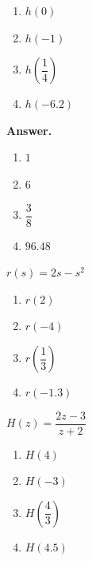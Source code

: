 \documentclass[10pt,]{book}
\theoremstyle{plain}
\theoremstyle{definition}
\theoremstyle{definition}
\theoremstyle{definition}
\theoremstyle{definition}
\numberwithin{equation}{part}
\begin{document}
\begin{exerciselist}
\begin{exercisegroup}
\begin{multicols}{2}
\begin{enumerate}[label=\alph*]
\item\hypertarget{li-417}{}\(h(0)\)%
\item\hypertarget{li-418}{}\(h(-1)\)%
\item\hypertarget{li-419}{}\(h\left(\dfrac{1}{4}\right)\)%
\item\hypertarget{li-420}{}\(h(-6.2)\)%
\end{enumerate}
\end{multicols}
%
\par\smallskip
\noindent\textbf{Answer.}\hypertarget{answer-65}{}\quad
\leavevmode%
\begin{multicols}{2}
\begin{enumerate}[label=\alph*]
\item\hypertarget{li-421}{}\(1\)%
\item\hypertarget{li-422}{}\(6\)%
\item\hypertarget{li-423}{}\(\dfrac{3}{8}\)%
\item\hypertarget{li-424}{}\(96.48 \)%
\end{enumerate}
\end{multicols}
%
\exercise[44.]\hypertarget{exercise-113}{}\(r (s) = 2s - s^2\) \leavevmode%
\begin{multicols}{2}
\begin{enumerate}[label=\alph*]
\item\hypertarget{li-425}{}\(r(2)\)%
\item\hypertarget{li-426}{}\(r(-4)\)%
\item\hypertarget{li-427}{}\(r\left(\dfrac{1}{3}\right)\)%
\item\hypertarget{li-428}{}\(r(-1.3)\)%
\end{enumerate}
\end{multicols}
%
\exercise[45.]\hypertarget{exercise-114}{}\(H(z) = \dfrac{2z - 3}{z + 2}\) \leavevmode%
\begin{multicols}{2}
\begin{enumerate}[label=\alph*]
\item\hypertarget{li-429}{}\(H(4)\)%
\item\hypertarget{li-430}{}\(H(-3)\)%
\item\hypertarget{li-431}{}\(H\left(\dfrac{4}{3}\right)\)%
\item\hypertarget{li-432}{}\(H(4.5)\)%
\end{enumerate}
\end{multicols}
%
\par\smallskip

\end{exercisegroup}
\end{exerciselist}
\end{document}
